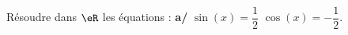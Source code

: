 
\begin{exercice}\label{exoautoanalyseCTU-3}

Résoudre dans $\eR$ les équations : {\bfseries  a/} $\sin (x) = \dfrac{1}{2}$  $\cos (x)=- \dfrac{1}{2}$.

\end{exercice}
